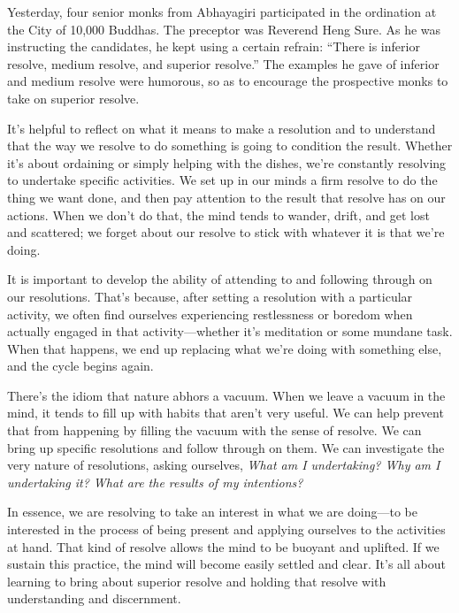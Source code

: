 
Yesterday, four senior monks from Abhayagiri participated in the 
ordination at the City of 10,000 Buddhas. The preceptor was Reverend 
Heng Sure. As he was instructing the candidates, he kept using a 
certain refrain: ``There is inferior resolve, medium resolve, and 
superior resolve.'' The examples he gave of inferior and medium resolve 
were humorous, so as to encourage the prospective monks to take on 
superior resolve.

It's helpful to reflect on what it means to make a resolution and to 
understand that the way we resolve to do something is going to 
condition the result. Whether it's about ordaining or simply helping 
with the dishes, we're constantly resolving to undertake specific 
activities. We set up in our minds a firm resolve to do the thing we 
want done, and then pay attention to the result that resolve has on our 
actions. When we don't do that, the mind tends to wander, drift, and 
get lost and scattered; we forget about our resolve to stick with 
whatever it is that we're doing.

It is important to develop the ability of attending to and following 
through on our resolutions. That's because, after setting a resolution 
with a particular activity, we often find ourselves experiencing 
restlessness or boredom when actually engaged in that 
activity---whether it's meditation or some mundane task. When that 
happens, we end up replacing what we're doing with something else, and 
the cycle begins again.

There's the idiom that nature abhors a vacuum. When we leave a vacuum 
in the mind, it tends to fill up with habits that aren't very useful. 
We can help prevent that from happening by filling the vacuum with the 
sense of resolve. We can bring up specific resolutions and follow 
through on them. We can investigate the very nature of resolutions, 
asking ourselves, \emph{What am I undertaking? Why am I undertaking it? 
What are the results of my intentions?}

In essence, we are resolving to take an interest in what we are 
doing---to be interested in the process of being present and applying 
ourselves to the activities at hand. That kind of resolve allows the 
mind to be buoyant and uplifted. If we sustain this practice, the mind 
will become easily settled and clear. It's all about learning to bring 
about superior resolve and holding that resolve with understanding and 
discernment.

